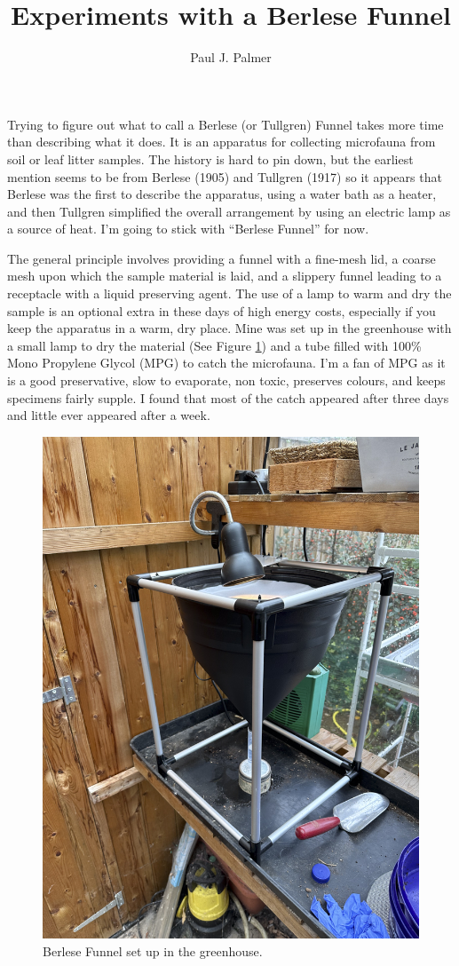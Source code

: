 \documentclass[
]{article}
\title{Experiments with a Berlese Funnel}
\author{Paul J. Palmer}
\date{}
\begin{document}
\maketitle

Trying to figure out what to call a Berlese (or Tullgren) Funnel takes more time than describing what it does. It is an apparatus for collecting microfauna from soil or leaf litter samples. The history is hard to pin down, but the earliest mention seems to be from Berlese (1905) and Tullgren (1917) so it appears that Berlese was the first to describe the apparatus, using a water bath as a heater, and then Tullgren simplified the overall arrangement by using an electric lamp as a source of heat. I'm going to stick with ``Berlese Funnel'' for now.

The general principle involves providing a funnel with a fine-mesh lid, a coarse mesh upon which the sample material is laid, and a slippery funnel leading to a receptacle with a liquid preserving agent. The use of a lamp to warm and dry the sample is an optional extra in these days of high energy costs, especially if you keep the apparatus in a warm, dry place. Mine was set up in the greenhouse with a small lamp to dry the material (See Figure \ref{fig:funnel}) and a tube filled with 100\% Mono Propylene Glycol (MPG) to catch the microfauna. I'm a fan of MPG as it is a good preservative, slow to evaporate, non toxic, preserves colours, and keeps specimens fairly supple. I found that most of the catch appeared after three days and little ever appeared after a week.

\begin{figure}

{\centering \includegraphics[width=0.8\linewidth]{images/LRES-5} 

}

\caption{Berlese Funnel set up in the greenhouse.}\label{fig:funnel}
\end{figure}
\end{document}
